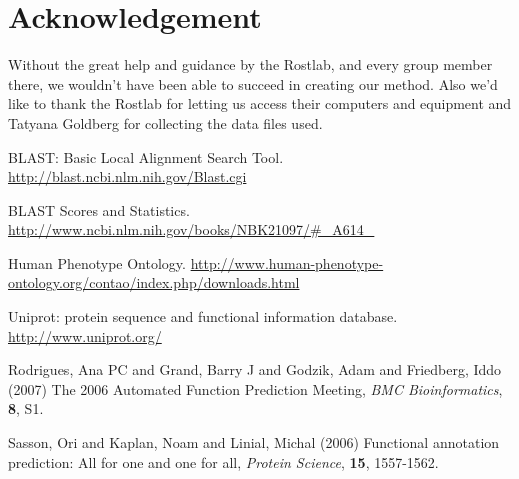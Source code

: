 \documentclass{bioinfo}
\begin{document}
\section*{Acknowledgement}
Without the great help and guidance by the Rostlab, and every group member there, we wouldn't have been able to succeed in creating our method. Also we'd like to thank the Rostlab for letting us access their computers and equipment and Tatyana Goldberg for collecting the data files used.

\begin{thebibliography}{}

 BLAST: Basic Local Alignment Search Tool. \href{http://blast.ncbi.nlm.nih.gov/Blast.cgi}{http://blast.ncbi.nlm.nih.gov/Blast.cgi}

 BLAST Scores and Statistics. \href{http://www.ncbi.nlm.nih.gov/books/NBK21097/\#\_A614\_}{http://www.ncbi.nlm.nih.gov/books/NBK21097/\#\_A614\_}

 Human Phenotype Ontology. \href{http://www.human-phenotype-ontology.org/contao/index.php/downloads.html}{http://www.human-phenotype-ontology.org/contao/index.php/downloads.html}

 Uniprot: protein sequence and functional information database. \href{http://www.uniprot.org/}{http://www.uniprot.org/}

 Rodrigues, Ana PC and Grand, Barry J and Godzik, Adam and Friedberg, Iddo (2007) The 2006 Automated Function Prediction Meeting, {\it BMC Bioinformatics}, {\bf 8}, S1. %

 Sasson, Ori and Kaplan, Noam and Linial, Michal (2006) Functional annotation prediction: All for one and one for all, {\it Protein Science}, {\bf 15}, 1557-1562.


\end{thebibliography}
\end{document}
